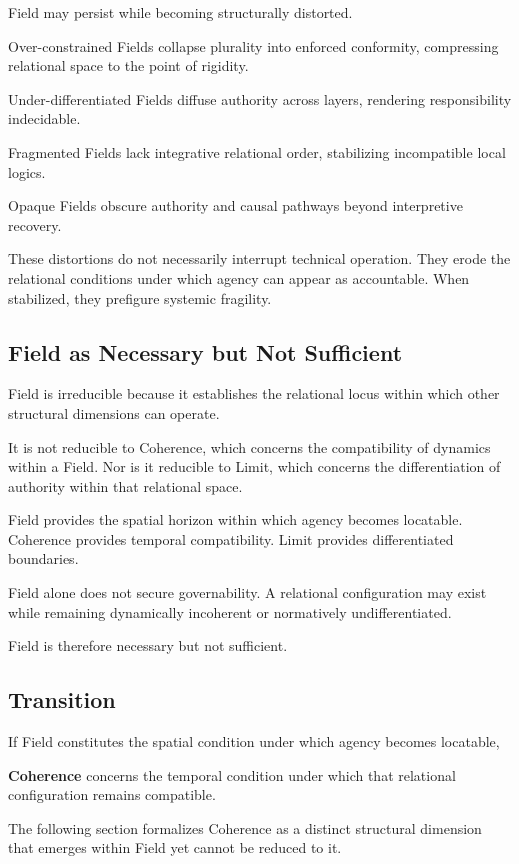 \documentclass[12pt]{article}
\begin{document}
Field may persist while becoming structurally distorted.

Over-constrained Fields collapse plurality into enforced conformity, compressing relational space to the point of rigidity.

Under-differentiated Fields diffuse authority across layers, rendering responsibility indecidable.

Fragmented Fields lack integrative relational order, stabilizing incompatible local logics.

Opaque Fields obscure authority and causal pathways beyond interpretive recovery.

These distortions do not necessarily interrupt technical operation. They erode the relational conditions under which agency can appear as accountable. When stabilized, they prefigure systemic fragility.

\subsection{Field as Necessary but Not Sufficient}


Field is irreducible because it establishes the relational locus within which other structural dimensions can operate.

It is not reducible to Coherence, which concerns the compatibility of dynamics within a Field. Nor is it reducible to Limit, which concerns the differentiation of authority within that relational space.

Field provides the spatial horizon within which agency becomes locatable. Coherence provides temporal compatibility. Limit provides differentiated boundaries.

Field alone does not secure governability. A relational configuration may exist while remaining dynamically incoherent or normatively undifferentiated.

Field is therefore necessary but not sufficient.

\subsection{Transition}


If Field constitutes the spatial condition under which agency becomes locatable,

\textbf{Coherence} concerns the temporal condition under which that relational configuration remains compatible.

The following section formalizes Coherence as a distinct structural dimension that emerges within Field yet cannot be reduced to it.
\end{document}

